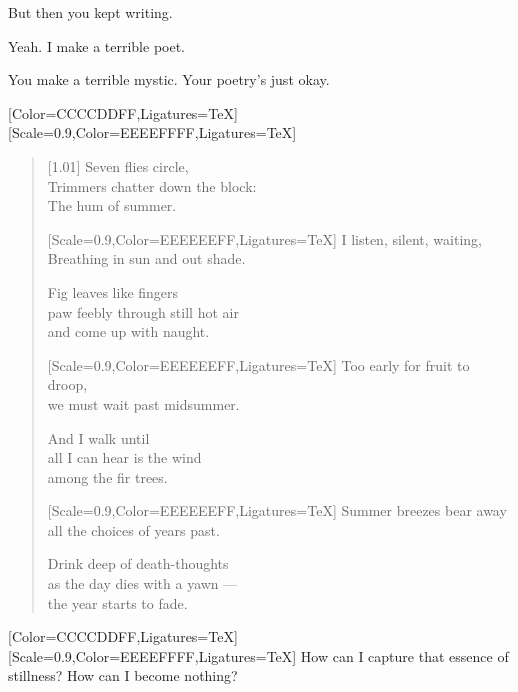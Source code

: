 \begin{paracol}{2}
\begin{leftcolumn}
\begin{ally}
But then you kept writing.
\end{ally}
\noindent Yeah. I make a terrible poet.

\begin{ally}
You make a terrible mystic. Your poetry's just okay.
\end{ally}
\newpage

\end{leftcolumn}
\begin{rightcolumn*}
  [Color=CCCCDDFF,Ligatures=TeX]
  \renewfontfamily{}[Scale=0.9,Color=EEEEFFFF,Ligatures=TeX]
  \begin{verse}[1.01\textwidth]
    \small
      Seven flies circle,\\
      Trimmers chatter down the block:\\
      The hum of summer.

      {[Scale=0.9,Color=EEEEEEFF,Ligatures=TeX] \vin I listen, silent, waiting,\\
      \vin Breathing in sun and out shade.}

      Fig leaves like fingers\\
      paw feebly through still hot air\\
      and come up with naught.

      {[Scale=0.9,Color=EEEEEEFF,Ligatures=TeX] \vin Too early for fruit to droop,\\
      \vin we must wait past midsummer.}

      And I walk until\\
      all I can hear is the wind\\
      among the fir trees.

      {[Scale=0.9,Color=EEEEEEFF,Ligatures=TeX] \vin Summer breezes bear away\\
      \vin all the choices of years past.}

      Drink deep of death-thoughts\\
      as the day dies with a yawn ---\\
      the year starts to fade.
    \end{verse}
\end{rightcolumn*}
\begin{leftcolumn}
  [Color=CCCCDDFF,Ligatures=TeX]
  \renewfontfamily{}[Scale=0.9,Color=EEEEFFFF,Ligatures=TeX]
\noindent How can I capture that essence of stillness? How can I become nothing?


\end{leftcolumn}
\end{paracol}
